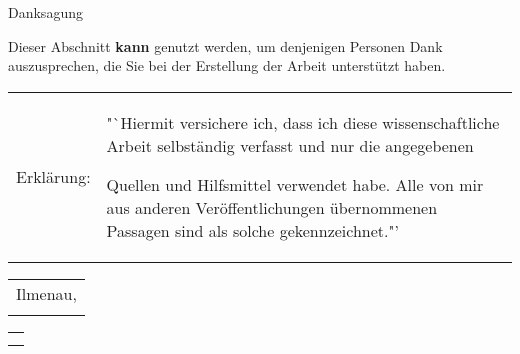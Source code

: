 \cleardoublepage

\vspace*{5cm}

Danksagung

Dieser Abschnitt {\bf kann} genutzt werden, um denjenigen Personen Dank auszusprechen, die Sie bei der Erstellung der Arbeit unterstützt haben.

\cleardoublepage

\vspace*{16cm}

\begin{tabular}{lp{12.5cm}}
	{Erklärung:} & {"`Hiermit versichere ich, dass ich diese wissenschaftliche Arbeit selbständig verfasst und nur die angegebenen

			
			
			
			Quellen und Hilfsmittel verwendet habe. Alle von mir aus anderen
			Veröffentlichungen übernommenen Passagen sind als solche gekennzeichnet."'}
\end{tabular}
\vspace*{1.5cm}

\begin{tabular}{l}
	Ilmenau, \settingsFinishDate \\
	\\
\end{tabular}
\hfill
\begin{tabular}{c}
	{\makebox[6.0cm]{\dotfill}} \\
	\settingsName               \\
\end{tabular}

\cleardoublepage

